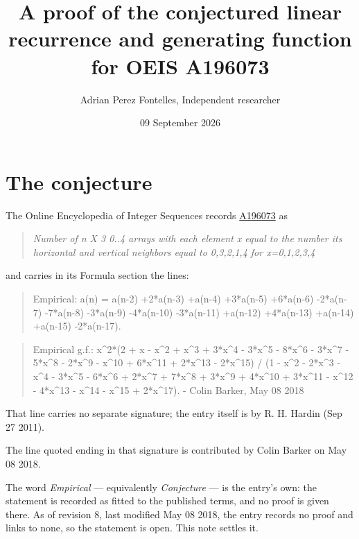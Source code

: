 \documentclass[11pt]{article}
\title{A proof of the conjectured linear recurrence and generating function for OEIS A196073}
\author{Adrian Perez Fontelles, Independent researcher}
\date{09 September 2026}
\theoremstyle{definition}
\begin{document}
\maketitle
\section{The conjecture}

The Online Encyclopedia of Integer Sequences records \href{https://oeis.org/A196073}{A196073} as

\begin{quote}\itshape Number of n X 3 0..4 arrays with each element x equal to the number its horizontal and vertical neighbors equal to 0,3,2,1,4 for x=0,1,2,3,4\end{quote}

and carries in its Formula section the lines:

\begin{quote}\ttfamily Empirical: a(n) = a(n-2) +2*a(n-3) +a(n-4) +3*a(n-5) +6*a(n-6) -2*a(n-7) -7*a(n-8) -3*a(n-9) -4*a(n-10) -3*a(n-11) +a(n-12) +4*a(n-13) +a(n-14) +a(n-15) -2*a(n-17).\end{quote}

\begin{quote}\ttfamily Empirical g.f.: x\textasciicircum{}2*(2 + x - x\textasciicircum{}2 + x\textasciicircum{}3 + 3*x\textasciicircum{}4 - 3*x\textasciicircum{}5 - 8*x\textasciicircum{}6 - 3*x\textasciicircum{}7 - 5*x\textasciicircum{}8 - 2*x\textasciicircum{}9 - x\textasciicircum{}10 + 6*x\textasciicircum{}11 + 2*x\textasciicircum{}13 - 2*x\textasciicircum{}15) / (1 - x\textasciicircum{}2 - 2*x\textasciicircum{}3 - x\textasciicircum{}4 - 3*x\textasciicircum{}5 - 6*x\textasciicircum{}6 + 2*x\textasciicircum{}7 + 7*x\textasciicircum{}8 + 3*x\textasciicircum{}9 + 4*x\textasciicircum{}10 + 3*x\textasciicircum{}11 - x\textasciicircum{}12 - 4*x\textasciicircum{}13 - x\textasciicircum{}14 - x\textasciicircum{}15 + 2*x\textasciicircum{}17). - Colin Barker, May 08 2018\end{quote}

That line carries no separate signature; the entry itself is by R. H. Hardin (Sep 27 2011).

The line quoted ending in that signature is contributed by Colin Barker on May 08 2018.

The word {\itshape Empirical} --- equivalently {\itshape Conjecture} --- is the entry's own: the statement is recorded as fitted to the published terms, and no proof is given there. As of revision 8, last modified May 08 2018, the entry records no proof and links to none, so the statement is open. This note settles it.
\end{document}

